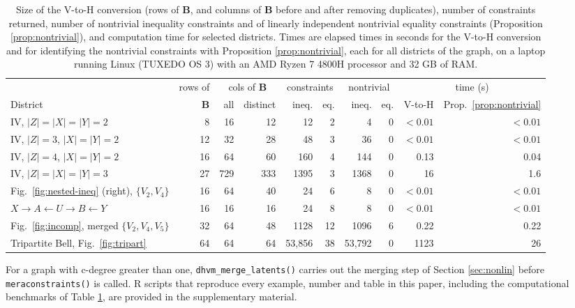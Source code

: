 \documentclass[12pt]{article}
\begin{document}
\begin{table}[!htbp]
\centering
\caption{Size of the V-to-H conversion (rows of $\boldsymbol{B}$, and columns of $\boldsymbol{B}$ before and after removing duplicates), number of constraints returned, number of nontrivial inequality constraints and of linearly independent nontrivial equality constraints (Proposition \ref{prop:nontrivial}), and computation time for selected districts. Times are elapsed times in seconds for the V-to-H conversion and for identifying the nontrivial constraints with Proposition \ref{prop:nontrivial}, each for all districts of the graph, on a laptop running Linux (TUXEDO OS 3) with an AMD Ryzen 7 4800H processor and 32 GB of RAM. \label{tab:compute}}
\small
\setlength{\tabcolsep}{4pt}
\begin{tabular}{lrrrrrrrrr}
\hline
 & rows of & \multicolumn{2}{c}{cols of $\boldsymbol{B}$} & \multicolumn{2}{c}{constraints} & \multicolumn{2}{c}{nontrivial} & \multicolumn{2}{c}{time (s)} \\
\cline{3-10}
District & $\boldsymbol{B}$ & all & distinct & ineq. & eq. & ineq. & eq. & V-to-H & Prop.~\ref{prop:nontrivial} \\
\hline
IV, $|Z|=|X|=|Y|=2$ & 8 & 16 & 12 & 12 & 2 & 4 & 0 & $<0.01$ & $<0.01$ \\
IV, $|Z|=3$, $|X|=|Y|=2$ & 12 & 32 & 28 & 48 & 3 & 36 & 0 & $<0.01$ & $<0.01$ \\
IV, $|Z|=4$, $|X|=|Y|=2$ & 16 & 64 & 60 & 160 & 4 & 144 & 0 & 0.13 & 0.04 \\
IV, $|Z|=|X|=|Y|=3$ & 27 & 729 & 333 & 1395 & 3 & 1368 & 0 & 16 & 1.6 \\
Fig.~\ref{fig:nested-ineq} (right), $\{V_2,V_4\}$ & 16 & 64 & 40 & 24 & 6 & 8 & 0 & $<0.01$ & $<0.01$ \\
$X \rightarrow A \leftarrow U \rightarrow B \leftarrow Y$ & 16 & 16 & 16 & 24 & 8 & 8 & 0 & $<0.01$ & $<0.01$ \\
Fig.~\ref{fig:incomp}, merged $\{V_2,V_4,V_5\}$ & 32 & 64 & 48 & 1128 & 12 & 1096 & 6 & 0.22 & 0.22 \\
Tripartite Bell, Fig.~\ref{fig:tripart} & 64 & 64 & 64 & 53,856 & 38 & 53,792 & 0 & 1123 & 26 \\
\hline
\end{tabular}
\end{table}




For a graph with c-degree greater than one, \texttt{dhvm\_merge\_latents()} carries out the merging step of Section \ref{sec:nonlin} before \texttt{meraconstraints()} is called. R scripts that reproduce every example, number and table in this paper, including the computational benchmarks of Table \ref{tab:compute}, are provided in the supplementary material.
\end{document}
